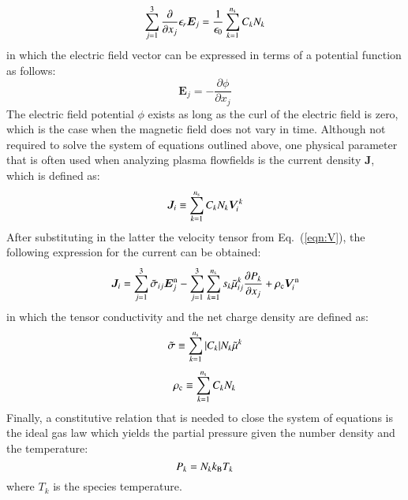 \documentclass{warpdoc}
\newcommand{\mfd}{\displaystyle}
\newcommand{\ns}{{n_{\rm s}}}
\renewcommand{\vec}[1]{\bm{#1}}
\begin{document}
%
\begin{equation}
\sum_{j=1}^3 \frac{\partial }{\partial x_j} \epsilon_r \vec{E}_j=\frac{1}{\epsilon_0} \sum_{k=1}^\ns C_k N_k 
\label{eqn:gauss}
\end{equation}
%
in which the electric field vector can be expressed in terms of a potential function as follows:  
%
\begin{equation}
  \vec{E}_j=-\frac{\partial \phi}{\partial x_j}
  \label{eqn:potential}
\end{equation}
%
The electric field potential $\phi$ exists as long as the curl of the electric field is zero, which is the case when the magnetic field does not vary in time.  
Although not required to solve the system of equations outlined above, one physical parameter that is often used when analyzing plasma flowfields is the current density $\vec{J}$, which is defined as:
%
\begin{equation}
  \vec{J}_i \equiv \sum_{k=1}^\ns C_k N_k  \vec{V}^k_i
 \label{eqn:Jdefinition}
\end{equation}
%
After substituting in the latter the velocity tensor from Eq.\ (\ref{eqn:V}), the following expression for the current can be obtained:
%
\begin{equation}
\begin{array}{l}
\mfd  \vec{J}_i = \sum_{j=1}^3  \wtilde{\sigma}_{ij} \vec{E}_j^{\rm n} 
             - \sum_{j=1}^3 \sum_{k=1}^\ns s_k \wtilde{\mu}^k_{ij}  \frac{\partial P_k}{\partial x_j}
+ \rho_{\rm c} \vec{V}_i^{\rm n} 
\end{array}
\label{eqn:J}
\end{equation}
%
in which the tensor conductivity and the net charge density are defined as:
%
\begin{equation}
\begin{array}{l}
\mfd
\wtilde{\sigma}\equiv\sum_{k=1}^\ns |C_k| N_k \wtilde{\mu}^k
\end{array}
\label{eqn:sigmatilde}
\end{equation}
%
%
\begin{equation}
\rho_{\rm c}\equiv\sum_{k=1}^\ns C_k N_k
\label{eqn:rhoe}
\end{equation}
%
Finally, a constitutive relation that is needed to close the system of equations is the ideal gas law which yields the partial pressure given the number density and the temperature:
%
\begin{equation}
P_k = N_k k_{\rm B} T_k
\label{eqn:Pk}
\end{equation}
%
where $T_k$ is the species temperature.
\end{document}
